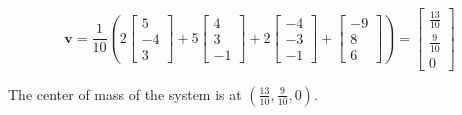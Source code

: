 \documentclass{../mathhomework}
\newcommand{\Vect}[1]{\pmb{#1}}
\begin{document}
\begin{problem}[1.3\#29]
    \begin{solution}
        \begin{equation*}
            \Vect{v} = \frac{1}{10}(2\begin{bmatrix}
                5 \\ -4 \\ 3
            \end{bmatrix} + 5 \begin{bmatrix}
                4 \\ 3 \\ -1
            \end{bmatrix} + 2 \begin{bmatrix}
                -4 \\ -3 \\ -1
            \end{bmatrix} + \begin{bmatrix}
                -9 \\ 8 \\ 6
            \end{bmatrix}) = \begin{bmatrix}
                \frac{13}{10} \\ \frac{9}{10} \\ 0
            \end{bmatrix}
        \end{equation*}

        The center of mass of the system is at $(\frac{13}{10}, \frac{9}{10}, 0)$.
    \end{solution}
\end{problem}
\end{document}
